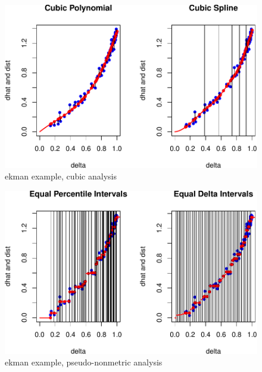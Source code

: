 \documentclass[
  12pt,
]{article}
\begin{document}
\begin{figure}

{\centering \includegraphics{smacofBS_files/figure-latex/ekmancubic-1} 

}

\caption{ekman example, cubic analysis}\label{fig:ekmancubic}
\end{figure}

\begin{figure}

{\centering \includegraphics{smacofBS_files/figure-latex/ekmanordinal-1} 

}

\caption{ekman example, pseudo-nonmetric analysis}\label{fig:ekmanordinal}
\end{figure}
\end{document}
